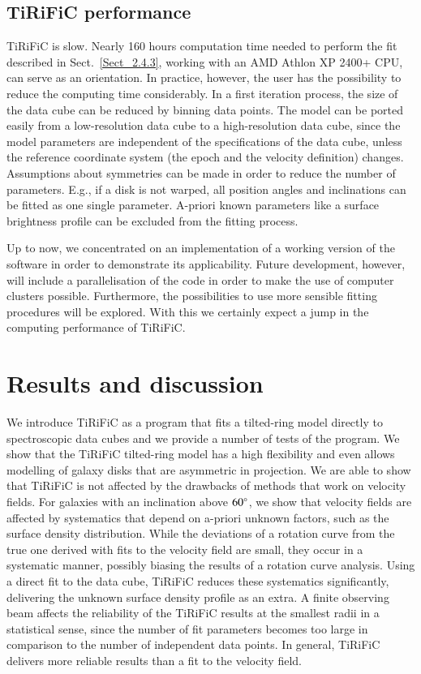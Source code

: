\documentclass[oldversion]{aa}
\renewcommand{\deg}{\hbox{$^\circ$}}
\newcommand{\cng}[1]{{#1}}
\newcommand{\cngs}[1]{{#1}}
\begin{document}
\subsection{TiRiFiC performance}
\label{Sect_2.4.4}
TiRiFiC is slow. \cngs{Nearly} 160 hours computation time needed to
perform the fit \cng{described in Sect.~\ref{Sect_2.4.3}}, working with
an AMD Athlon XP 2400+ CPU, can serve as an orientation.
\cngs{In practice, however, the user has the possibility to reduce the computing time considerably. In a first iteration process, the size of the data cube can be reduced by binning data points. The model can be ported easily from a low-resolution data cube to a high-resolution data cube, since the model parameters are independent of the specifications of the data cube, unless the reference coordinate system (the epoch and the velocity definition) changes. Assumptions about symmetries can be made in order to reduce the number of parameters. E.g., if a disk is not warped, all position angles and inclinations can be fitted as one single parameter. A-priori known parameters like a surface brightness profile can be excluded from the fitting process.}

Up to now, we concentrated on an implementation of a working version of
the software in order to demonstrate its applicability.  Future
development, however, will include a parallelisation of the code in
order to make the use of computer clusters possible.  Furthermore, the
possibilities to use more sensible fitting procedures will be
explored. With this we certainly expect a jump in the computing
performance of TiRiFiC.
\section{Results and discussion}
\label{Sect_2.6}
We introduce TiRiFiC as a program that fits a tilted-ring model
directly to spectroscopic data cubes \cng{and we provide a number of tests of the program}. We show that the TiRiFiC
tilted-ring model has a high flexibility and even allows modelling
of \cng{galaxy disks that are asymmetric in projection.} We are able to 
show that TiRiFiC is not affected by the drawbacks of methods that work on
velocity fields. \cng{For galaxies with an inclination above $60\deg$, we show that velocity} fields are affected by systematics
that depend on a-priori unknown factors, such as the surface density
distribution. \cng{While the deviations of a rotation curve from the true one derived with fits to the velocity field are small, they occur in a systematic manner, possibly biasing the results of a rotation curve analysis.}
Using a \cng{direct} fit to the data cube,
TiRiFiC reduces these systematics significantly, delivering the
unknown surface density profile as an extra. \cng{A finite observing beam affects the reliability of the TiRiFiC results at the smallest radii in a statistical sense, since the number of fit parameters becomes too large in comparison to the number of independent data points. In general, TiRiFiC delivers more reliable results than a fit to the velocity field.}  
\end{document}
